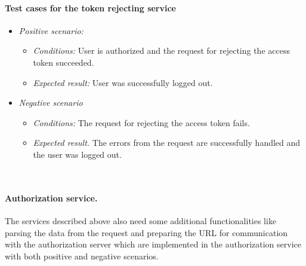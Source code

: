 \paragraph*{Test cases for the token rejecting service} 
\begin{itemize}
    \item \emph{Positive scenario:} 
        \begin{itemize}
            \item \emph{Conditions:} User is authorized and the request for rejecting the access token succeeded.
            \item \emph{Expected result:} User was successfully logged out.
        \end{itemize}
    \item \emph{Negative scenario} 
        \begin{itemize}
            \item \emph{Conditions:} The request for rejecting the access token fails.
            \item \emph{Expected result.} The errors from the request are successfully handled and the user was logged out.
        \end{itemize}
\end{itemize}


\


\paragraph*{Authorization service.} The services described above also need some additional functionalities like parsing the data from the request and preparing the URL for communication with the authorization server which are implemented in the authorization service with both positive and negative scenarios. 


